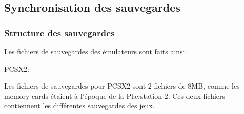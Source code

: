 \documentclass[a4paper,12pt,french]{sphinxmanual}
\begin{document}
\begin{sphinxVerbatim}[commandchars=\\\{\}]
  
              
                \PYG{p}{[}\PYG{p}{]}

               
                \PYG{p}{[}\PYG{p}{]}
            
            
\end{sphinxVerbatim}


\subsection{Synchronisation des sauvegardes}
\label{\detokenize{organique:synchronisation-des-sauvegardes}}

\subsubsection{Structure des sauvegardes}
\label{\detokenize{organique:structure-des-sauvegardes}}
\sphinxAtStartPar
Les fichiers de sauvegardes des émulateurs sont faits ainsi:

\sphinxAtStartPar
PCSX2:

\sphinxAtStartPar
Les fichiers de sauvegardes pour PCSX2 sont 2 fichiers de 8MB, comme  les memory cards étaient à l’époque de la Playstation 2. Ces deux fichiers contiennent les différentes sauvegardes des jeux.

\sphinxAtStartPar
{}
\end{document}

